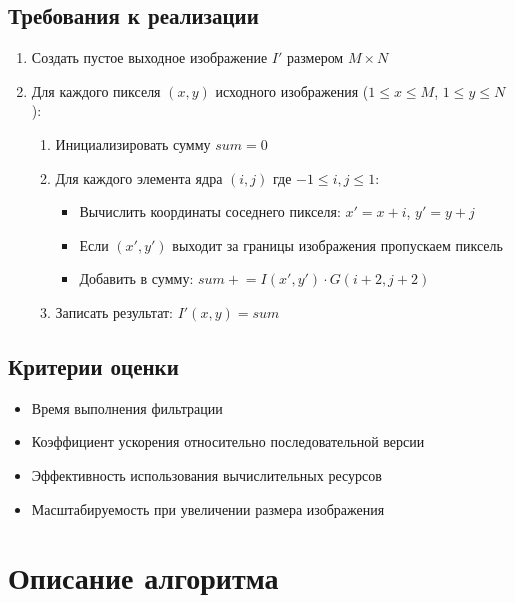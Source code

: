 \documentclass[a4paper,12pt]{article}
\begin{document}
\subsection*{Требования к реализации}
\begin{enumerate}
    \item Создать пустое выходное изображение $I'$ размером $M \times N$
    
    \item Для каждого пикселя $(x,y)$ исходного изображения ($1 \leq x \leq M$, $1 \leq y \leq N$):
    \begin{enumerate}
        \item Инициализировать сумму $sum = 0$
        
        \item Для каждого элемента ядра $(i,j)$ где $-1 \leq i,j \leq 1$:
        \begin{itemize}
            \item Вычислить координаты соседнего пикселя: 
            $x' = x + i$, $y' = y + j$
            
            \item Если $(x',y')$ выходит за границы изображения пропускаем пиксель
            
            \item Добавить в сумму: 
            $sum \mathrel{+}= I(x',y') \cdot G(i+2,j+2)$
        \end{itemize}
        
        \item Записать результат: $I'(x,y) = sum$
    \end{enumerate}
\end{enumerate}


\subsection*{Критерии оценки}
\begin{itemize}
    \item Время выполнения фильтрации
    \item Коэффициент ускорения относительно последовательной версии
    \item Эффективность использования вычислительных ресурсов
    \item Масштабируемость при увеличении размера изображения
\end{itemize}
\newpage

\section{Описание алгоритма}
\end{document}
